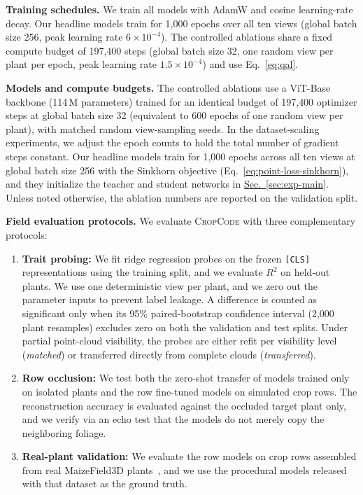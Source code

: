 \documentclass[10pt,twocolumn,letterpaper]{article}
\newcommand{\secref}[1]{\hyperref[#1]{Sec.~\ref*{#1}}}
\newcommand{\method}{\textup{\textsc{CropCode}}}   %
\begin{document}
\noindent\textbf{Training schedules.}
We train all models with AdamW and cosine learning-rate decay. Our headline models train for 1{,}000 epochs over all ten views (global batch size 256, peak learning rate $6 \times 10^{-4}$). The controlled ablations share a fixed compute budget of 197{,}400 steps (global batch size 32, one random view per plant per epoch, peak learning rate $1.5 \times 10^{-4}$) and use Eq.~\eqref{eq:qal}.

\noindent\textbf{Models and compute budgets.}
The controlled ablations use a ViT-Base backbone (114\,M parameters) trained for an identical budget of 197{,}400 optimizer steps at global batch size 32 (equivalent to 600 epochs of one random view per plant), with matched random view-sampling seeds. In the dataset-scaling experiments, we adjust the epoch counts to hold the total number of gradient steps constant. Our headline models train for 1{,}000 epochs across all ten views at global batch size 256 with the Sinkhorn objective (Eq.~\ref{eq:point-loss-sinkhorn}), and they initialize the teacher and student networks in \secref{sec:exp-main}. Unless noted otherwise, the ablation numbers are reported on the validation split.

\noindent\textbf{Field evaluation protocols.}
We evaluate \method{} with three complementary protocols:
\begin{enumerate}
  \item \textbf{Trait probing:} We fit ridge regression probes on the frozen \texttt{[CLS]} representations using the training split, and we evaluate $R^2$ on held-out plants. We use one deterministic view per plant, and we zero out the parameter inputs to prevent label leakage. A difference is counted as significant only when its 95\% paired-bootstrap confidence interval (2{,}000 plant resamples) excludes zero on both the validation and test splits. Under partial point-cloud visibility, the probes are either refit per visibility level (\emph{matched}) or transferred directly from complete clouds (\emph{transferred}).
  \item \textbf{Row occlusion:} We test both the zero-shot transfer of models trained only on isolated plants and the row fine-tuned models on simulated crop rows. The reconstruction accuracy is evaluated against the occluded target plant only, and we verify via an echo test that the models do not merely copy the neighboring foliage.
  \item \textbf{Real-plant validation:} We evaluate the row models on crop rows assembled from real MaizeField3D plants~\citep{maizefield3d2025}, and we use the procedural models released with that dataset as the ground truth.
\end{enumerate}
\end{document}
